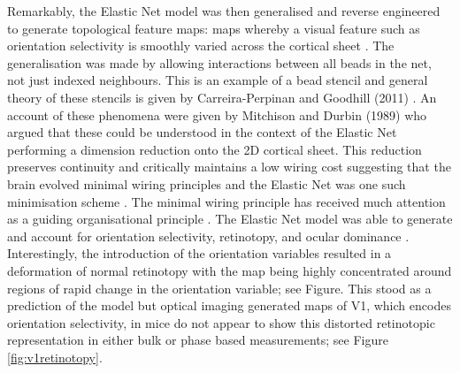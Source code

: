 Remarkably, the Elastic Net model was then generalised and reverse engineered to generate topological feature maps: maps whereby a visual feature such as orientation selectivity is smoothly varied across the cortical sheet \cite{Bednar2016-lg}. The generalisation was made by allowing interactions between all beads in the net, not just indexed neighbours. This is an example of a bead stencil and general theory of these stencils is given by Carreira-Perpinan and Goodhill (2011) \cite{Carreira-Perpinan2011-aa}. An account of these phenomena were given by Mitchison and Durbin (1989) who argued that these could be understood in the context of the Elastic Net performing a dimension reduction onto the 2D cortical sheet. This reduction preserves continuity and critically maintains a low wiring cost suggesting that the brain evolved minimal wiring principles and the Elastic Net was one such minimisation scheme \cite{Durbin1990-tn}. The minimal wiring principle has received much attention as a guiding organisational principle \cite{Chklovskii2004-da}. The Elastic Net model was able to generate and account for orientation selectivity, retinotopy, and ocular dominance \cite{Goodhill2000-on, Goodhill1994-dn, Goodhill2000-vp, Goodhill1990-dr}. Interestingly, the introduction of the orientation variables resulted in a deformation of normal retinotopy with the map being highly concentrated around regions of rapid change in the orientation variable; see Figure. This stood as a prediction of the model but optical imaging generated maps of V1, which encodes orientation selectivity, in mice do not appear to show this distorted retinotopic representation in either bulk or phase based measurements; see Figure \ref{fig:v1retinotopy}. 
